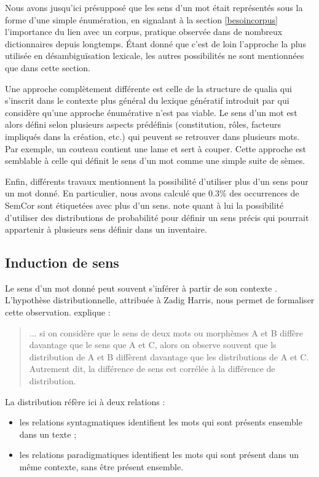 Nous avons jusqu'ici présupposé que les sens d'un mot était représentés sous la forme d'une simple énumération, en signalant à la section \ref{besoincorpus} l'importance du lien avec un corpus, pratique observée dans de nombreux dictionnaires depuis longtemps. Étant donné que c'est de loin l'approche la plus utilisée en désambiguïsation lexicale, les autres possibilités ne sont mentionnées que dans cette section.

Une approche complètement différente est celle de la structure de qualia \citep{johnston1996qualia} qui s'inscrit dans le contexte plus général du lexique génératif introduit par \cite{pustejovsky1991generative} qui considère qu'une approche énumérative n'est pas viable. Le sens d'un mot est alors défini selon plusieurs aspects prédéfinis (constitution, rôles, facteurs impliqués dans la création, etc.) qui peuvent se retrouver dans plusieurs mots. Par exemple, un couteau contient une lame et sert à couper. Cette approche est semblable à celle qui définit le sens d'un mot comme une simple suite de sèmes.

Enfin, différents travaux mentionnent la possibilité d'utiliser plus d'un sens pour un mot donné. En particulier, nous avons calculé que 0.3\% des occurrences de SemCor sont étiquetées avec plus d'un sens. \cite{smith2011rumble} note quant à lui la possibilité d'utiliser des distributions de probabilité pour définir un sens précis qui pourrait appartenir à plusieurs sens définir dans un inventaire.

\subsection{Induction de sens}
\label{distrib}

Le sens d'un mot donné peut souvent s'inférer à partir de son contexte \citep{pantel2002discovering}. L'hypothèse distributionnelle, attribuée à Zadig Harris, nous permet de formaliser cette observation. \cite[p.~786]{harris1954distributional} explique :

\begin{quote}
... si on considère que le sens de deux mots ou morphèmes A et B diffère davantage que le sens que A et C, alors on observe souvent que ls distribution de A et B diffèrent davantage que les distributions de A et C. Autrement dit, la différence de sens est corrélée à la différence de distribution.
\end{quote}

La distribution réfère ici à deux relations \citep{sahlgren2008distributional} :
\begin{itemize}
    \item les relations syntagmatiques identifient les mots qui sont présents ensemble dans un texte ;
    \item les relations paradigmatiques identifient les mots qui sont présent dans un même contexte, sans être présent ensemble.
\end{itemize}


